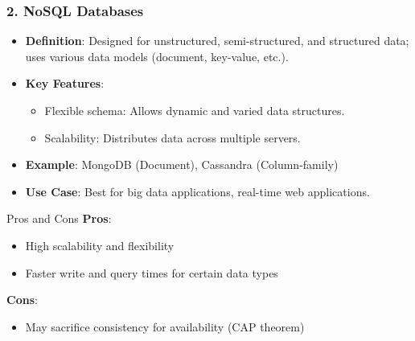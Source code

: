 \documentclass[aspectratio=169]{beamer}
\begin{document}
\begin{frame}[fragile]
    \frametitle{2. NoSQL Databases}
    \begin{itemize}
        \item \textbf{Definition}: Designed for unstructured, semi-structured, and structured data; uses various data models (document, key-value, etc.).
        \item \textbf{Key Features}:
        \begin{itemize}
            \item Flexible schema: Allows dynamic and varied data structures.
            \item Scalability: Distributes data across multiple servers.
        \end{itemize}
        \item \textbf{Example}: MongoDB (Document), Cassandra (Column-family)
        \item \textbf{Use Case}: Best for big data applications, real-time web applications.
    \end{itemize}
    
    \begin{block}{Pros and Cons}
        \textbf{Pros}:
        \begin{itemize}
            \item High scalability and flexibility
            \item Faster write and query times for certain data types
        \end{itemize}
        
        \textbf{Cons}:
        \begin{itemize}
            \item May sacrifice consistency for availability (CAP theorem)
        \end{itemize}
    \end{block}
\end{frame}
\end{document}
